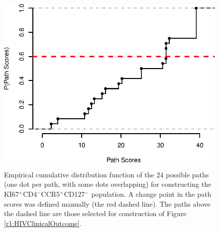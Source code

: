   \begin{figure}[ht]
    \begin{center}
      \includegraphics[height=9cm, angle=0]{figs/rchy/figs/cdf}
    \end{center}
    \caption{Empirical cumulative distribution function of the $24$ possible paths (one dot per path, with some dots overlapping) for constructing the KI67$^+$CD4$^-$CCR5$^+$CD127$^-$ population. A change point in the path scores was defined manually (the red dashed line). The paths above the dashed line are those selected for construction of Figure \ref{r1:HIVClinicalOutcome}.}
    \label{r1:cdf}
  \end{figure}


